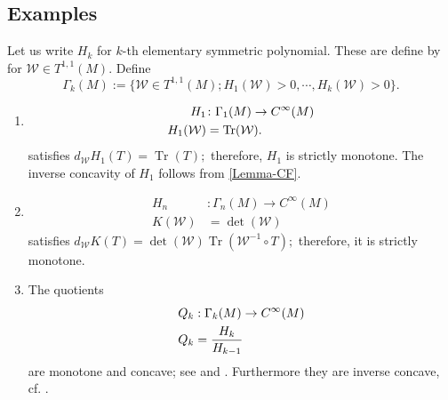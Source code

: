 \subsection*{Examples}
Let us write $H_k$ for $k$-th elementary symmetric polynomial. These are define by
for $\mathcal{W}\in T^{1,1}(M).$
Define
\[\Gamma_k(M):=\{\mathcal{W}\in T^{1,1}(M); H_1(\mathcal{W})>0,\cdots, H_{k}(\mathcal{W})>0\}.\]
\begin{enumerate}
  \item
\begin{align*}H_1&\colon \Gamma_1(M)\rightarrow C^{\infty}(M)\\
H_1(\mathcal{W})&=\operatorname{Tr}(\mathcal{W}).
\end{align*}
satisfies
$d_\mathcal{W}H_1(T)=\operatorname{Tr}(T);$ therefore, $H_1$ is strictly monotone. The inverse concavity of $H_1$ follows from \cref{Lemma-CF}.
  \item
\begin{align*}
H_n&:\Gamma_n(M)\to C^{\infty}(M)\\
K(\mathcal{W})&=\det(\mathcal{W})
\end{align*}
satisfies
$d_\mathcal{W}K(T)=\det(\mathcal{W})\operatorname{Tr}(\mathcal{W}^{-1}\circ T);$ therefore, it is strictly monotone.
\item The quotients
\begin{align*}
Q_k&:\Gamma_k(M)\to C^{\infty}(M)\\
Q_k&=\frac{H_k}{H_{k-1}}
\end{align*}
are monotone and concave; see \cite[Cor.~5.3]{Andrews:/2007} and \cite[Thm.~2.5]{HuiskenSinestrari:09/1999}. Furthermore they are inverse concave, cf. \cite[Cor.~2.4, Thm.~2.6]{Andrews:/2007}.
\end{enumerate}
